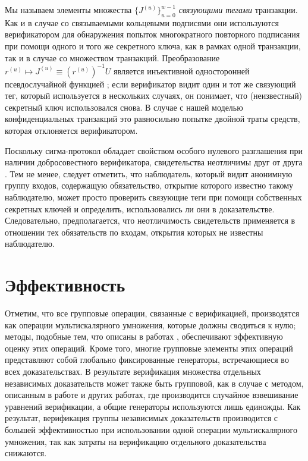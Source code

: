 \documentclass{article}
\theoremstyle{definition}
\begin{document}
Мы называем элементы множества $\{J^{(u)}\}_{u=0}^{w-1}$ \textit{связующими тегами} транзакции.
Как и в случае со связываемыми кольцевыми подписями они используются верификатором для обнаружения попыток многократного повторного подписания при помощи одного и того же секретного ключа, как в рамках одной транзакции, так и в случае со множеством транзакций.
Преобразование $r^{(u)} \mapsto J^{(u)} \equiv (r^{(u)})^{-1}U$ является инъективной односторонней псевдослучайной функцией \cite{dodis}; если верификатор видит один и тот же связующий тег, который используется в нескольких случаях, он понимает, что (неизвестный) секретный ключ использовался снова.
В случае с нашей моделью конфиденциальных транзакций это равносильно попытке двойной траты средств, которая отклоняется верификатором.

Поскольку сигма-протокол обладает свойством  особого нулевого разглашения при наличии добросовестного верификатора, свидетельства неотличимы друг от друга \cite{cramer}.
Тем не менее, следует отметить, что наблюдатель, который видит анонимную группу входов, содержащую обязательство, открытие которого известно такому наблюдателю, может просто проверить связующие теги при помощи собственных секретных ключей и определить, использовались ли они в доказательстве.
Следовательно, предполагается, что неотличимость свидетельств применяется в отношении тех обязательств по входам, открытия которых не известны наблюдателю.


\section{Эффективность}
Отметим, что все групповые операции, связанные с верификацией, производятся как операции мультискалярного умножения, которые должны сводиться к нулю; методы, подобные тем, что описаны в работах \cite{straus,pippenger}, обеспечивают эффективную оценку этих операций.
Кроме того, многие групповые элементы этих операций представляют собой глобально фиксированные генераторы, встречающиеся во всех доказательствах.
В результате верификация множества отдельных независимых доказательств может также быть групповой, как в случае с методом, описанным в работе \cite{bulletproofs} и других работах, где производится случайное взвешивание уравнений верификации, а общие генераторы используются лишь единожды.
Как результат, верификация группы независимых доказательств производится с большей эффективностью при использовании одной операции мультискалярного умножения, так как затраты на верификацию отдельного доказательства снижаются.
\end{document}
